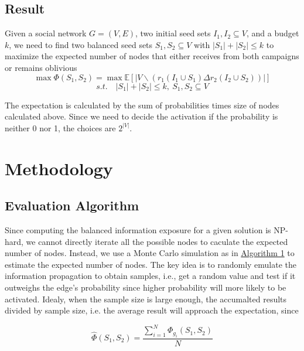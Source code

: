 \documentclass{article}
\begin{document}
\subsection{Result}

Given a social network $G = (V, E)$, two initial seed sets $I_1, I_2 \subseteq V$, and a budget $k$, we need to find two balanced seed sets $S_1, S_2 \subseteq V$ with $|S_1| + |S_2| \leq k$ to maximize the expected number of nodes that either receives from both campaigns or remains oblivious
\[
    \max \Phi \left( S_1, S_2 \right) = \max \mathbb{E} \left[ |V \backslash (r_1(I_1\cup S_1) \Delta r_2(I_2\cup S_2))| \right]
\]
\[
    s.t.\quad |S_1| + |S_2| \leq k, \  S_1, S_2 \subseteq V
\]

The expectation is calculated by the sum of probabilities times size of nodes calculated above. Since we need to decide the activation if the probability is neither 0 nor 1, the choices are $2^{|V|}$.

\section{Methodology}

\subsection{Evaluation Algorithm}
Since computing the balanced information exposure for a given solution is NP-hard, we cannot directly iterate all the possible nodes to caculate the expected number of nodes. Instead, we use a Monte Carlo simulation as in \href{alg:monte-carlo}{Algorithm 1} to estimate the expected number of nodes. The key idea is to randomly emulate the information propagation to obtain samples, i.e., get a random value and test if it outweighs the edge's probability since higher probability will more likely to be activated. Idealy, when the sample size is large enough, the accumalted results divided by sample size, i.e. the average result will approach the expectation, since

\[
    \widehat{\Phi} \left( S_1, S_2 \right) = \frac{\sum_{i=1}^{N} \Phi_{g_i}\left(S_1, S_2\right)}{N}
\]
\end{document}
